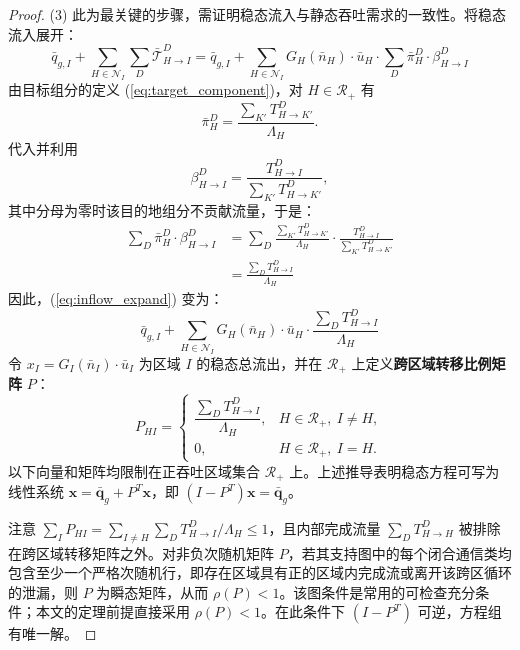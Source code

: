 \documentclass[a4paper,12pt]{article}
\theoremstyle{plain}
\theoremstyle{definition}
\theoremstyle{remark}
\begin{document}
\begin{proof}
(3) 此为最关键的步骤，需证明稳态流入与静态吞吐需求的一致性。将稳态流入展开：
\begin{equation}\label{eq:inflow_expand}
    \bar{q}_{g,I} + \sum_{H\in\mathcal N_I} \sum_D \bar{\mathcal{T}}_{H \to I}^D = \bar{q}_{g,I} + \sum_{H\in\mathcal N_I} G_H(\bar{n}_H) \cdot \bar{u}_H \cdot \sum_D \bar\pi_H^D \cdot \beta_{H \to I}^D
\end{equation}
由目标组分的定义 (\ref{eq:target_component})，对 $H\in\mathcal R_+$ 有
\begin{equation}
    \bar\pi_H^D = \frac{\sum_{K'} T_{H \to K'}^D}{\Lambda_H}.
\end{equation}
代入并利用
\begin{equation}
    \beta_{H \to I}^D =
    \frac{T_{H \to I}^D}{\sum_{K'} T_{H \to K'}^D},
\end{equation}
其中分母为零时该目的地组分不贡献流量，于是：
\begin{equation}
\begin{aligned}
    \sum_D \bar\pi_H^D \cdot \beta_{H \to I}^D
    &= \sum_D \frac{\sum_{K'} T_{H \to K'}^D}{\Lambda_H} \cdot \frac{T_{H \to I}^D}{\sum_{K'} T_{H \to K'}^D} \\
    &= \frac{\sum_D T_{H \to I}^D}{\Lambda_H}
\end{aligned}
\end{equation}
因此，(\ref{eq:inflow_expand}) 变为：
\begin{equation}
    \bar{q}_{g,I} + \sum_{H\in\mathcal N_I} G_H(\bar{n}_H) \cdot \bar{u}_H \cdot \frac{\sum_D T_{H \to I}^D}{\Lambda_H}
\end{equation}
令 $x_I = G_I(\bar{n}_I) \cdot \bar{u}_I$ 为区域 $I$ 的稳态总流出，并在 $\mathcal R_+$ 上定义\textbf{跨区域转移比例矩阵} $P$：
\begin{equation}\label{eq:transfer_matrix}
    P_{HI} =
    \begin{cases}
    \dfrac{\sum_D T_{H \to I}^D}{\Lambda_H}, & H\in\mathcal R_+,\ I\ne H,\\[1.0em]
    0, & H\in\mathcal R_+,\ I=H .
    \end{cases}
\end{equation}
以下向量和矩阵均限制在正吞吐区域集合 $\mathcal R_+$ 上。上述推导表明稳态方程可写为线性系统 $\bm{x} = \bar{\bm{q}}_g + P^T \bm{x}$，即 $(I - P^T)\bm{x} = \bar{\bm{q}}_g$。

注意 $\sum_I P_{HI} = \sum_{I\ne H}\sum_D T_{H \to I}^D / \Lambda_H \leq 1$，且内部完成流量 $\sum_D T_{H \to H}^D$ 被排除在跨区域转移矩阵之外。对非负次随机矩阵 $P$，若其支持图中的每个闭合通信类均包含至少一个严格次随机行，即存在区域具有正的区域内完成流或离开该跨区循环的泄漏，则 $P$ 为瞬态矩阵，从而 $\rho(P)<1$。该图条件是常用的可检查充分条件；本文的定理前提直接采用 $\rho(P)<1$。在此条件下 $(I-P^T)$ 可逆，方程组有唯一解。


\end{proof}
\end{document}
